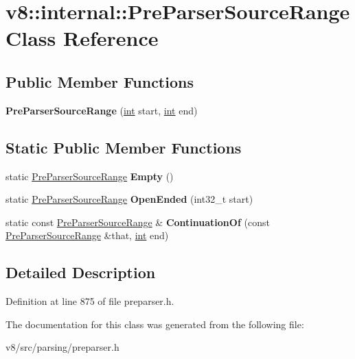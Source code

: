 \hypertarget{classv8_1_1internal_1_1PreParserSourceRange}{}\section{v8\+:\+:internal\+:\+:Pre\+Parser\+Source\+Range Class Reference}
\label{classv8_1_1internal_1_1PreParserSourceRange}
\subsection*{Public Member Functions}
\begin{DoxyCompactItemize}
\item 
\mbox{\label{classv8_1_1internal_1_1PreParserSourceRange_abf177b05d4edf29e9a84741f9025bb56}} 
{\bfseries Pre\+Parser\+Source\+Range} (\mbox{\hyperlink{classint}{int}} start, \mbox{\hyperlink{classint}{int}} end)
\end{DoxyCompactItemize}
\subsection*{Static Public Member Functions}
\begin{DoxyCompactItemize}
\item 
\mbox{\label{classv8_1_1internal_1_1PreParserSourceRange_a71bf4ebdbb5b80ecdf2efd4d90d6e89e}} 
static \mbox{\hyperlink{classv8_1_1internal_1_1PreParserSourceRange}{Pre\+Parser\+Source\+Range}} {\bfseries Empty} ()
\item 
\mbox{\label{classv8_1_1internal_1_1PreParserSourceRange_ad30635f32d2982e276b54c192d8e71ad}} 
static \mbox{\hyperlink{classv8_1_1internal_1_1PreParserSourceRange}{Pre\+Parser\+Source\+Range}} {\bfseries Open\+Ended} (int32\+\_\+t start)
\item 
\mbox{\label{classv8_1_1internal_1_1PreParserSourceRange_aeb094d1624eefab81154f5a2084771d6}} 
static const \mbox{\hyperlink{classv8_1_1internal_1_1PreParserSourceRange}{Pre\+Parser\+Source\+Range}} \& {\bfseries Continuation\+Of} (const \mbox{\hyperlink{classv8_1_1internal_1_1PreParserSourceRange}{Pre\+Parser\+Source\+Range}} \&that, \mbox{\hyperlink{classint}{int}} end)
\end{DoxyCompactItemize}


\subsection{Detailed Description}


Definition at line 875 of file preparser.\+h.



The documentation for this class was generated from the following file\+:\begin{DoxyCompactItemize}
\item 
v8/src/parsing/preparser.\+h\end{DoxyCompactItemize}
